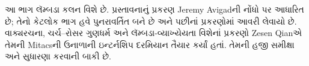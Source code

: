 \documentclass[../../include/open-logic-part]{subfiles}
\begin{document}

\begin{editorial}
આ ભાગ લૅમ્બડા કલન વિશે છે. પ્રસ્તાવનાનું પ્રકરણ Jeremy Avigadની
નોંધો પર આધારિત છે; તેનો કેટલોક ભાગ હવે પુનરાવર્તિત બને છે અને પછીનાં
પ્રકરણોમાં આવરી લેવાયો છે. વાક્યરચના, ચર્ચ--રોસર ગુણધર્મ અને
લૅમ્બડા-વ્યાખ્યેયતા વિશેનાં પ્રકરણો Zesen Qianએ તેમની Mitacsની
ઉનાળાની ઇન્ટર્નશિપ દરમિયાન તૈયાર કર્યાં હતાં. તેમની હજી સમીક્ષા
અને સુધારણા કરવાની બાકી છે.
\end{editorial}





\OLEndPartHook
\end{document}
